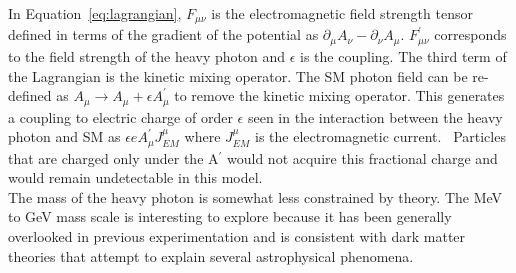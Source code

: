 In Equation~\eqref{eq:lagrangian}, $F_{\mu\nu}$ is the electromagnetic field strength tensor defined in terms of the gradient of the potential as $\partial_{\mu}A_{\nu}-\partial_{\nu}A_{\mu}$. $F^{\prime}_{\mu\nu}$ corresponds to the field strength of the heavy photon and $\epsilon$ is the coupling. The third term of the Lagrangian is the kinetic mixing operator. The SM photon field can be re-defined as $A_{\mu}\rightarrow A_{\mu}+\epsilon A^{\prime}_{\mu}$ to remove the kinetic mixing operator. This generates a coupling to electric charge of order $\epsilon$ seen in the interaction between the heavy photon and SM as $\epsilon e A^{\prime}_{\mu}J^{\mu}_{EM}$ where $J^{\mu}_{EM}$ is the electromagnetic current.~\cite{bjorken_new_2009} Particles that are charged only under the A$^{\prime}$ would not acquire this fractional charge and would remain undetectable in this model. \\
\indent The mass of the heavy photon is somewhat less constrained by theory. The MeV to GeV mass scale is interesting to explore because it has been generally overlooked in previous experimentation and is consistent with dark matter theories that attempt to explain several astrophysical phenomena. 